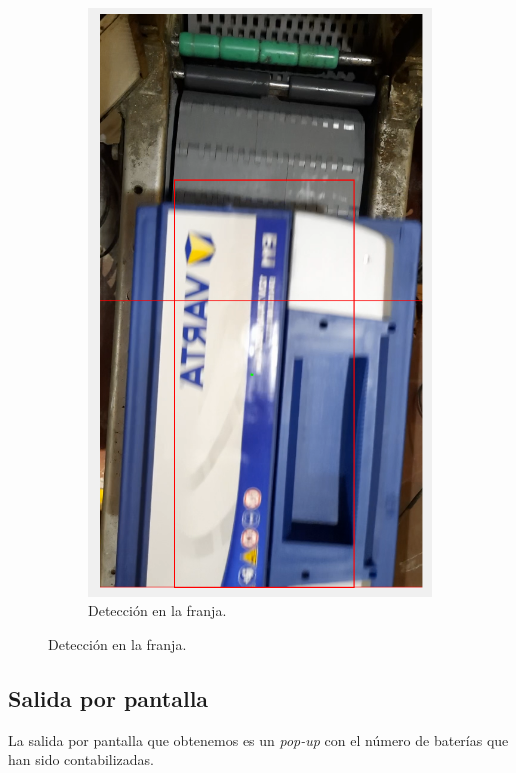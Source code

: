 \documentclass[11pt]{memoir}
\begin{document}
\begin{center}
\begin{figure}[H]
\begin{subfigure}{0.4\textwidth}
    \includegraphics[width=\textwidth]{img/P2}
    \caption{Detección en la franja.}
    \label{fig:treal2}
\end{subfigure}
\end{figure}
\end{center}

\vfill
\subsection{Salida por pantalla}
La salida por pantalla que obtenemos es un \textit{pop-up} con el número de baterías que han sido contabilizadas.
\end{document}
